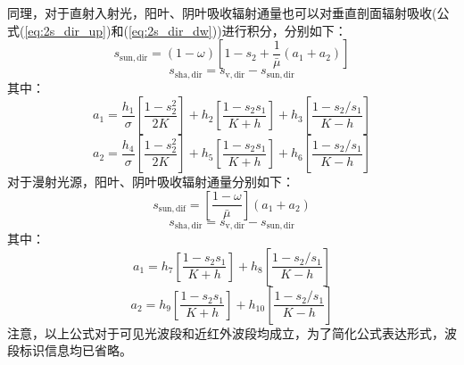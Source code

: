 同理，对于直射入射光，阳叶、阴叶吸收辐射通量也可以对垂直剖面辐射吸收(公式(\ref{eq:2s_dir_up})和(\ref{eq:2s_dir_dw}))进行积分，分别如下：
\begin{equation}
  s_{\mathrm{sun, dir}}=(1-\omega)\left[1-s_{2}+\frac{1}{\bar{\mu}}\left(a_{1}+a_{2}\right)\right]
\end{equation}
\begin{equation}
  s_{\mathrm{sha, dir}}=s_{\mathrm{v, dir}}-s_{\mathrm{sun, dir}}
\end{equation}
其中：
\begin{equation}
  a_{1}=\frac{h_{1}}{\sigma}\left[\frac{1-s_{2}^{2}}{2 K}\right]+h_{2}\left[\frac{1-s_{2} s_{1}}{K+h}\right]+h_{3}\left[\frac{1-s_{2} / s_{1}}{K-h}\right]
\end{equation}
%
\begin{equation}
  a_{2}=\frac{h_{4}}{\sigma}\left[\frac{1-s_{2}^{2}}{2 K}\right]+h_{5}\left[\frac{1-s_{2} s_{1}}{K+h}\right]+h_{6}\left[\frac{1-s_{2} / s_{1}}{K-h}\right]
\end{equation}
对于漫射光源，阳叶、阴叶吸收辐射通量分别如下：
\begin{equation}
  s_{\mathrm{sun,dif}}=\left[\frac{1-\omega}{\bar{\mu}}\right]\left(a_{1}+a_{2}\right)
\end{equation}
\begin{equation}
  s_{\mathrm{sha, dir}}=s_{\mathrm{v, dir}}-s_{\mathrm{sun, dir}}
\end{equation}
其中：
\begin{equation}
  a_{1}=h_{7}\left[\frac{1-s_{2} s_{1}}{K+h}\right]+h_{8}\left[\frac{1-s_{2} / s_{1}}{K-h}\right]
\end{equation}
%
\begin{equation}
  a_{2}=h_{9}\left[\frac{1-s_{2} s_{1}}{K+h}\right]+h_{10}\left[\frac{1-s_{2} / s_{1}}{K-h}\right]
\end{equation}
注意，以上公式对于可见光波段和近红外波段均成立，为了简化公式表达形式，波段标识信息均已省略。



